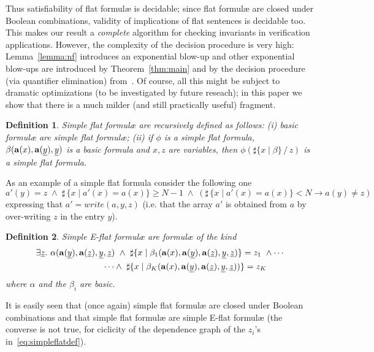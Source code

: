 \documentclass[11pt,a4paper]{article}
\newcommand{\formulae}{formul\ae\xspace}
\newcommand{\uy}{\ensuremath{\underline y}}
\newcommand{\uz}{\ensuremath{\underline z}}
\newcommand{\ta}{\ensuremath{{\bf a}}\xspace}
\newtheorem{definition}{Definition}
\begin{document}
Thus satisfiability of flat \formulae is decidable; since flat \formulae are closed under Boolean combinations, validity of implications of flat sentences 
is decidable too. This makes
our
result a \emph{complete} algorithm for checking invariants in verification applications.
However, the complexity of the decision procedure is very high:  Lemma~\ref{lemma:nf} introduces an exponential blow-up and other 
exponential blow-ups are introduced by Theorem~\ref{thm:main}
and by the
decision procedure (via quantifier elimination)  from~\cite{schweikhart}. 
Of course, all this might be subject to dramatic optimizations (to be investigated by future reseach); in this paper we show  that there is 
 a much milder 
(and still practically useful) fragment.

\begin{definition}
 Simple flat \formulae are recursively defined as follows: (i) basic \formulae are simple flat \formulae; 
(ii) if $\phi$ is a simple flat formula,
$\beta(\ta(x), \ta(\uy), \uy)$ is a basic formula and $x, z$ are variables, then $\phi(\sharp\{x\!\mid\! \beta\}\,/\,z)$ is a  simple flat formula.
\end{definition}


As an example of a simple flat formula consider the following one 
$$
a'(y)= z \;\wedge\; \sharp\, \{x \mid a'(x)=a(x)\}\geq N\!-\!1\; \wedge\; (\sharp\, \{x \mid a'(x)=a(x)\}<N \to a(y)  \neq z)
$$
expressing that $a'=write(a, y, z)$ (i.e. that the array $a'$ is obtained from $a$ by over-writing $z$ in the entry $y$). 

\begin{definition}
Simple E-flat \formulae are \formulae of the kind 
  \begin{equation}\label{eq:simpleflatdef}
  \begin{aligned}
   \exists \uz.~\alpha(\ta(\uy),\ta(\uz),\uy, \uz)~ \wedge~ \sharp\{x\mid \beta_1(\ta(x),\ta(\uy),\ta(\uz), \uy,\uz)\} =z_1~\wedge \cdots
   \\
   \cdots\wedge~ \sharp\{x\mid \beta_K(\ta(x),\ta(\uy), \ta(\uz), \uy,\uz))\} =z_K~~~~~~
  \end{aligned}
\end{equation}
where $\alpha$ and the $\beta_i$ are basic.
\end{definition}


It is easily seen that (once again) simple flat \formulae are closed under Boolean combinations and that simple flat \formulae are simple E-flat \formulae 
(the converse is not true, for ciclicity of the dependence graph of the $z_i$'s in~\eqref{eq:simpleflatdef}). 
\end{document}
